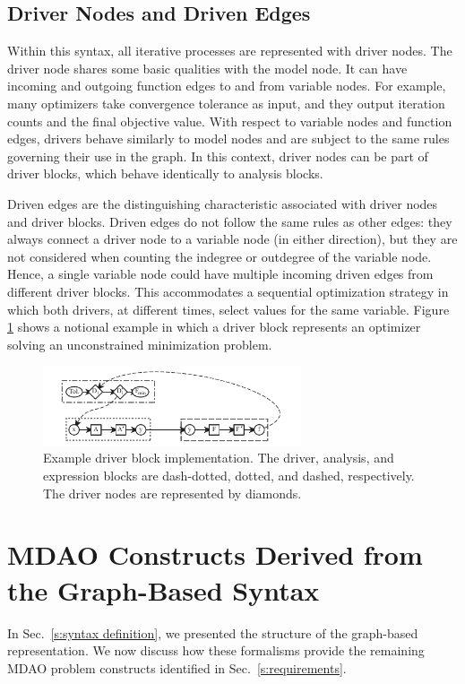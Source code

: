   \subsection{Driver Nodes and Driven Edges}
  Within this syntax, all iterative processes are represented with driver nodes. 
  The driver node shares some basic qualities with the model node. It can have incoming 
  and outgoing function edges to and from variable nodes. For example, many optimizers take 
  convergence tolerance as input, and they output iteration counts and the final objective value. 
  With respect to variable nodes and function edges, drivers behave similarly to
  model nodes and are subject to the same rules governing their use in the graph. In this
  context, driver nodes can be part of driver blocks, which behave identically to analysis 
  blocks. 

  Driven edges are the distinguishing characteristic associated with driver nodes and
  driver blocks. Driven edges do not follow the same rules as other edges: they  
   always connect a driver node to a variable node (in either direction), but they 
  are not considered when counting the indegree or outdegree of the variable node.
  Hence, a single variable node could have multiple incoming driven edges from different 
  driver blocks. This accommodates a sequential optimization strategy in which both drivers, at 
  different times, select values for the same variable. Figure \ref{f:driver block} shows 
  a notional example in which a driver block represents an optimizer solving an 
  unconstrained minimization problem. 

  \begin{figure}[htb]
    \begin{center}
    \includegraphics[width=3.0in]{images/driver_block}
    \end{center}
    \vspace{-10pt}
  \caption{Example driver block implementation. The driver, analysis, and expression blocks are dash-dotted, dotted, and dashed, respectively. The driver nodes are represented by diamonds.}
  \label{f:driver block}
  \end{figure}


\section{MDAO Constructs Derived from the Graph-Based Syntax}
  \label{s:graph representation}
  In Sec.~\ref{s:syntax definition}, we presented the structure of the graph-based 
  representation. We now discuss how these formalisms provide the remaining MDAO problem 
  constructs identified in Sec.~\ref{s:requirements}.

